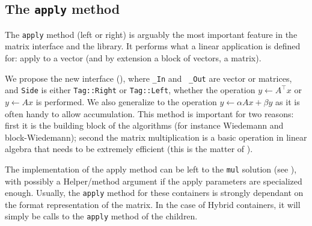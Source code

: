 \subsection{The \texttt{apply} method}\label{ssec:apply}
%
%
\par
%
The \texttt{apply} method (left or right) is arguably the most important
feature in the matrix interface and the \linbox library. It performs what a
linear application is defined for: apply to a vector (and by extension  a block
of vectors, \ie a matrix).
%
\par
%
We propose the new interface (), where {\tt \_In} and {\tt
\_Out} are vector or matrices, and {\tt Side} is either {\tt Tag::Right} or
{\tt Tag::Left}, whether the operation $y \gets A^{\top} x$ or  $y \gets A x$ is
performed. We also generalize to the operation $y \gets \alpha A x + \beta y$ as
it is often handy to allow accumulation.
%
%
This method is important for two reasons: first it is the building block of the
\applin algorithms (for instance Wiedemann and block-Wiedemann); second the
matrix multiplication is a basic operation in linear algebra that needs to be
extremely efficient (this is the matter of ).
%

%
\par
%
The implementation of the apply method can be left to the {\tt mul} solution
(see ), with possibly a Helper/method argument if the apply
parameters are specialized enough.
%
%
Usually,  the {\tt apply} method for these
containers is strongly dependant on the format representation of the matrix. In
the case of Hybrid containers, it will simply be calls to the {\tt apply}
method of the children.
%
